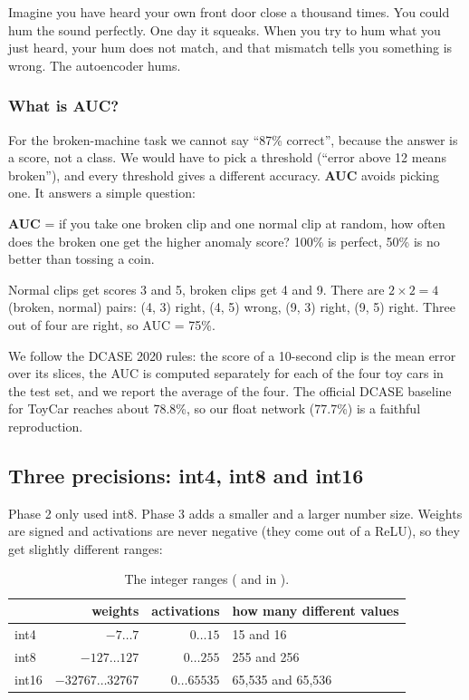 \begin{kid}
Imagine you have heard your own front door close a thousand times. You could hum the sound perfectly. One day
it squeaks. When you try to hum what you just heard, your hum does not match, and that mismatch tells you
something is wrong. The autoencoder hums.
\end{kid}

\subsubsection*{What is AUC?}

For the broken-machine task we cannot say ``87\% correct'', because the answer is a score, not a class. We would
have to pick a threshold (``error above 12 means broken''), and every threshold gives a different accuracy.
\textbf{AUC} avoids picking one. It answers a simple question:

\begin{keyidea}
\textbf{AUC} = if you take one broken clip and one normal clip at random, how often does the broken one get the
higher anomaly score? 100\% is perfect, 50\% is no better than tossing a coin.
\end{keyidea}

\begin{example}
Normal clips get scores 3 and 5, broken clips get 4 and 9. There are $2\times2 = 4$ (broken, normal) pairs:
(4, 3) right, (4, 5) wrong, (9, 3) right, (9, 5) right. Three out of four are right, so AUC = 75\%.
\end{example}

We follow the DCASE 2020 rules: the score of a 10-second clip is the mean error over its slices, the AUC is
computed separately for each of the four toy cars in the test set, and we report the average of the four. The
official DCASE baseline for ToyCar reaches about 78.8\%, so our float network (77.7\%) is a faithful
reproduction.

\subsection{Three precisions: int4, int8 and int16}

Phase 2 only used int8. Phase 3 adds a smaller and a larger number size. Weights are signed and activations
are never negative (they come out of a ReLU), so they get slightly different ranges:

\begin{table}[H]
\centering
\small
\begin{tabular}{lrrl}
\toprule
 & weights & activations & how many different values\\
\midrule
int4 & $-7 \dots 7$ & $0 \dots 15$ & 15 and 16\\
int8 & $-127 \dots 127$ & $0 \dots 255$ & 255 and 256\\
int16 & $-32767 \dots 32767$ & $0 \dots 65535$ & 65{,}535 and 65{,}536\\
\bottomrule
\end{tabular}
\caption{The integer ranges ( and  in ).}
\end{table}

